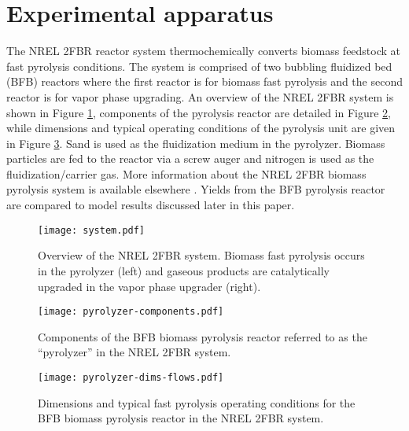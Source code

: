 
\section{Experimental apparatus}

The NREL 2FBR reactor system thermochemically converts biomass feedstock at fast pyrolysis conditions. The system is comprised of two bubbling fluidized bed (BFB) reactors where the first reactor is for biomass fast pyrolysis and the second reactor is for vapor phase upgrading. An overview of the NREL 2FBR system is shown in Figure \ref{fig:nrel-system}, components of the pyrolysis reactor are detailed in Figure \ref{fig:pyrolyzer-components}, while dimensions and typical operating conditions of the pyrolysis unit are given in Figure \ref{fig:pyrolyzer-dims-flows}. Sand is used as the fluidization medium in the pyrolyzer. Biomass particles are fed to the reactor via a screw auger and nitrogen is used as the fluidization/carrier gas. More information about the NREL 2FBR biomass pyrolysis system is available elsewhere \cite{Howe-2015, Trendewicz-2015}. Yields from the BFB pyrolysis reactor are compared to model results discussed later in this paper.

\begin{figure}[H]
    \centering
    \texttt{[image: system.pdf]}
    \caption{Overview of the NREL 2FBR system. Biomass fast pyrolysis occurs in the pyrolyzer (left) and gaseous products are catalytically upgraded in the vapor phase upgrader (right).}
    \label{fig:nrel-system}
\end{figure}

\begin{figure}[H]
    \centering
    \texttt{[image: pyrolyzer-components.pdf]}
    \caption{Components of the BFB biomass pyrolysis reactor referred to as the ``pyrolyzer'' in the NREL 2FBR system.}
    \label{fig:pyrolyzer-components}
\end{figure}

\begin{figure}[H]
    \centering
    \texttt{[image: pyrolyzer-dims-flows.pdf]}
    \caption{Dimensions and typical fast pyrolysis operating conditions for the BFB biomass pyrolysis reactor in the NREL 2FBR system.}
    \label{fig:pyrolyzer-dims-flows}
\end{figure}
